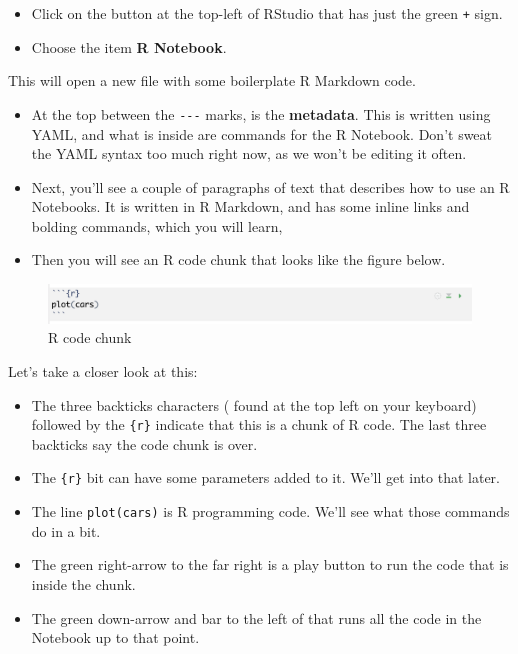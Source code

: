 \documentclass[]{book}
\providecommand{\tightlist}{%
  \setlength{\itemsep}{0pt}\setlength{\parskip}{0pt}}
\begin{document}
\begin{itemize}
\tightlist
\item
  Click on the button at the top-left of RStudio that has just the green
  \texttt{+} sign.
\item
  Choose the item \textbf{R Notebook}.
\end{itemize}

This will open a new file with some boilerplate R Markdown code.

\begin{itemize}
\tightlist
\item
  At the top between the \texttt{-\/-\/-} marks, is the
  \textbf{metadata}. This is written using YAML, and what is inside are
  commands for the R Notebook. Don't sweat the YAML syntax too much
  right now, as we won't be editing it often.
\item
  Next, you'll see a couple of paragraphs of text that describes how to
  use an R Notebooks. It is written in R Markdown, and has some inline
  links and bolding commands, which you will learn,
\item
  Then you will see an R code chunk that looks like the figure below.
\end{itemize}

\begin{figure}
\centering
\includegraphics[width=6.25000in]{_images/02-rstudio-rcodechunk.png}
\caption{R code chunk}
\end{figure}

Let's take a closer look at this:

\begin{itemize}
\tightlist
\item
  The three backticks characters ( found at the top left on your
  keyboard) followed by the \texttt{\{r\}} indicate that this is a chunk
  of R code. The last three backticks say the code chunk is over.
\item
  The \texttt{\{r\}} bit can have some parameters added to it. We'll get
  into that later.
\item
  The line \texttt{plot(cars)} is R programming code. We'll see what
  those commands do in a bit.
\item
  The green right-arrow to the far right is a play button to run the
  code that is inside the chunk.
\item
  The green down-arrow and bar to the left of that runs all the code in
  the Notebook up to that point.
\end{itemize}
\end{document}
